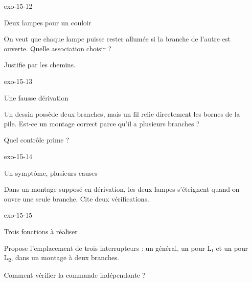 \documentclass[12pt,twoside,openany]{book}
\begin{document}
\begin{blocLivre}{exo-15-12}
\begin{exercice}[3]{Deux lampes pour un couloir}
\begin{questions}
\item On veut que chaque lampe puisse rester allumée si la branche de l’autre est ouverte. Quelle association choisir ?
\item Justifie par les chemins.
\end{questions}
\end{exercice}\end{blocLivre}
\begin{blocLivre}{exo-15-13}
\begin{exercice}[3]{Une fausse dérivation}
\begin{questions}
\item Un dessin possède deux branches, mais un fil relie directement les bornes de la pile. Est-ce un montage correct parce qu’il a plusieurs branches ?
\item Quel contrôle prime ?
\end{questions}
\end{exercice}\end{blocLivre}
\begin{blocLivre}{exo-15-14}
\begin{exercice}[3]{Un symptôme, plusieurs causes}
\begin{questions}
\item Dans un montage supposé en dérivation, les deux lampes s’éteignent quand on ouvre une seule branche. Cite deux vérifications.
\end{questions}
\end{exercice}\end{blocLivre}
\begin{blocLivre}{exo-15-15}
\begin{exercice}[3]{Trois fonctions à réaliser}
\begin{questions}
\item Propose l’emplacement de trois interrupteurs : un général, un pour L₁ et un pour L\textsubscript{2}, dans un montage à deux branches.
\item Comment vérifier la commande indépendante ?
\end{questions}
\end{exercice}\end{blocLivre}
\end{document}

